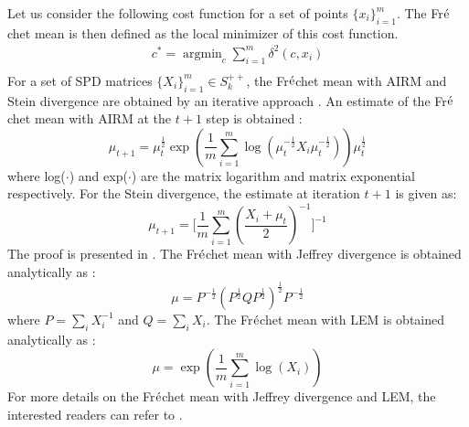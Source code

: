 \documentclass[review]{elsarticle}
\begin{document}
	Let us consider the following cost function for a set of points ${\{x_i\}}_{i=1}^{m}$. The Fr$\acute{\rm e}$chet mean \cite{nielsen2013matrix} is then defined as the local minimizer of this cost function.
\begin{equation}
\label{fre_Mean}
\begin{split}
c^* = \mathop{\arg\min}_{c}\sum_{i=1}^{m}\delta^2(c,x_i)  \\
\end{split}
\end{equation}
For a set of SPD matrices ${\{X_i\}}_{i=1}^{m} \in S_{k}^{++} $, the Fr$\acute{\rm e}$chet mean with AIRM and Stein divergence are obtained by an iterative approach \cite{pennec2006riemannian,cherian2013jensen}. An estimate of the Fr$\acute{\rm e}$chet mean with AIRM at the $t+1$ step is obtained \cite{pennec2006riemannian}:
\begin{equation}
\label{eq14}
{\mu}_{t+1} = \mu_{t}^{\frac{1}{2}}\exp(\frac{1}{m}\sum_{i=1}^{m}\log(\mu_{t}^{-\frac{1}{2}}{X_i}\mu_{t}^{-\frac{1}{2}}))\mu_{t}^{\frac{1}{2}}
\end{equation} 
where log($\cdot$) and exp($\cdot$) are the matrix logarithm and matrix exponential respectively. For the Stein divergence, the estimate at iteration $t+1$ is given as:
\begin{equation}
\label{eq15}
{\mu}_{t+1} = \lbrack \frac{1}{m}\sum_{i=1}^{m}(\frac{X_i+\mu_t}{2})^{-1} \rbrack^{-1}
\end{equation} 
The proof is presented in \cite{cherian2013jensen}. The Fr$\acute{\rm e}$chet mean with Jeffrey divergence is obtained analytically as \cite{faraki2015more}:
\begin{equation}
\label{eq16}
{\mu} = P^{-\frac{1}{2}}(P^{\frac{1}{2}}QP^{\frac{1}{2}})^{\frac{1}{2}} P^{-\frac{1}{2}}
\end{equation} 
where $P = \sum_{i}X_{i}^{-1}$ and $Q = \sum_{i}X_{i}$. The Fr$\acute{\rm e}$chet mean with LEM is obtained analytically as \cite{arsigny2007geometric}:
\begin{equation}
\label{eq17}
{\mu} = \exp(\frac{1}{m}\sum_{i=1}^{m}\log(X_i))
\end{equation} 
For more details on the Fr$\acute{\rm e}$chet mean with Jeffrey divergence and LEM, the interested readers
can refer to \cite{faraki2015more,arsigny2007geometric}.
\end{document}
